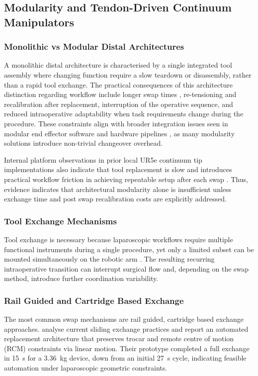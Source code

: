 \documentclass[12pt]{article}
\begin{document}
\subsection{Modularity and Tendon-Driven Continuum Manipulators}
\subsubsection{Monolithic vs Modular Distal Architectures}

A monolithic distal architecture is characterised by a single
integrated tool assembly where changing function require a slow teardown or disassembly, rather than a rapid tool exchange.
The practical consequences of this architecture distinction regarding workflow include longer swap times \parencite{cowan2024classification},
re-tensioning and recalibration after replacement, interruption of the
operative sequence, and reduced intraoperative adaptability when task
requirements change during the procedure. 
These constraints align with broader
integration issues seen in modular end effector software and hardware
pipelines \parencite{torielli2023ros}, as many modularity solutions introduce non-trivial changeover overhead.

Internal platform observations in prior local UR5e continuum tip implementations
also indicate that tool replacement is slow and introduces
practical workflow friction in achieving repeatable setup after each swap
\parencite{scott2023macro}. Thus, evidence indicates that architectural modularity alone is insufficient unless
exchange time and post swap recalibration costs are explicitly addressed.

\subsubsection{Tool Exchange Mechanisms}

Tool exchange is necessary because laparoscopic workflows require multiple
functional instruments during a single procedure, yet only a limited subset
can be mounted simultaneously on the robotic arm \parencite{ko2025tool}. The resulting recurring
intraoperative transition can interrupt surgical
flow and, depending on the swap method, introduce further coordination
variability.

\subsubsection{Rail Guided and Cartridge Based Exchange}
The most common swap mechanisms are rail guided,
cartridge based exchange approaches. \textcite{ko2025tool} analyse current sliding
exchange practices and report an automated replacement architecture that preserves
 trocar and remote centre of motion (RCM) constraints via linear motion. Their prototype completed a full exchange in 15~s for a 3.36~kg device, down from an
initial 27~s cycle, indicating feasible automation under laparoscopic geometric constraints.
\end{document}
